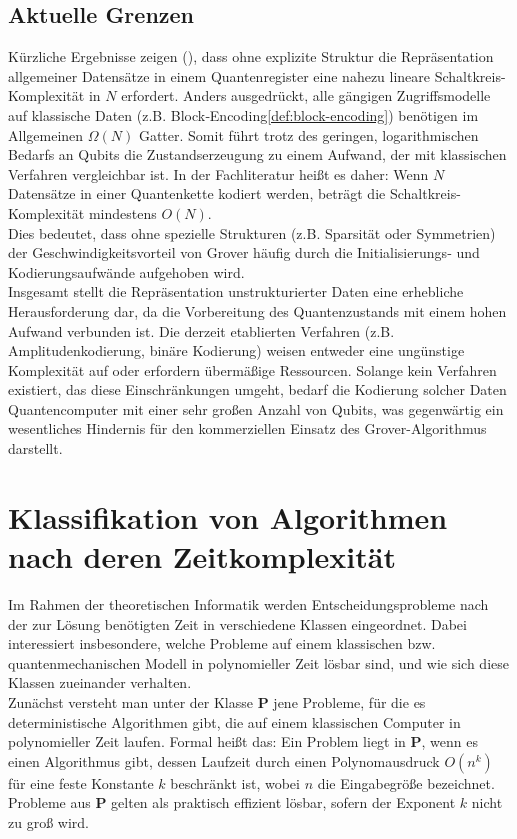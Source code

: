 {\subsection{Aktuelle Grenzen}
Kürzliche Ergebnisse zeigen (\cite{zhang_xiao-ming_circuit_2024}), dass ohne explizite Struktur die Repräsentation allgemeiner Datensätze in einem Quantenregister eine nahezu lineare Schaltkreis-Komplexität in \(N\) erfordert. Anders ausgedrückt, alle gängigen Zugriffsmodelle auf klassische Daten (z.B. Block‑Encoding\ref{def:block-encoding}) benötigen im Allgemeinen \(\Omega(N)\) Gatter. Somit führt trotz des geringen, logarithmischen Bedarfs an Qubits die Zustandserzeugung zu einem Aufwand, der mit klassischen Verfahren vergleichbar ist. In der Fachliteratur heißt es daher: 
Wenn \(N\) Datensätze in einer Quantenkette kodiert werden, beträgt die Schaltkreis-Komplexität mindestens \(O(N)\).\\

Dies bedeutet, dass ohne spezielle Strukturen (z.B. Sparsität oder Symmetrien) der Geschwindigkeitsvorteil von Grover häufig durch die Initialisierungs‑ und Kodierungsaufwände aufgehoben wird.\\

Insgesamt stellt die Repräsentation unstrukturierter Daten eine erhebliche Herausforderung dar, da die Vorbereitung des Quantenzustands mit einem hohen Aufwand verbunden ist. Die derzeit etablierten Verfahren (z.B. Amplitudenkodierung, binäre Kodierung) weisen entweder eine ungünstige Komplexität auf oder erfordern übermäßige Ressourcen. Solange kein Verfahren existiert, das diese Einschränkungen umgeht, bedarf die Kodierung solcher Daten Quantencomputer mit einer sehr großen Anzahl von Qubits, was gegenwärtig ein wesentliches Hindernis für den kommerziellen Einsatz des Grover-Algorithmus darstellt.

\section{Klassifikation von Algorithmen nach deren Zeitkomplexität}

Im Rahmen der theoretischen Informatik werden Entscheidungsprobleme nach der zur Lösung benötigten Zeit in verschiedene Klassen eingeordnet. Dabei interessiert insbesondere, welche Probleme auf einem klassischen bzw. quantenmechanischen Modell in polynomieller Zeit lösbar sind, und wie sich diese Klassen zueinander verhalten.\\

Zunächst versteht man unter der Klasse \(\mathbf{P}\) jene Probleme, für die es deterministische Algorithmen gibt, die auf einem klassischen Computer in polynomieller Zeit laufen. Formal heißt das: Ein Problem liegt in \(\mathbf{P}\), wenn es einen Algorithmus gibt, dessen Laufzeit durch einen Polynomausdruck \(O(n^k)\) für eine feste Konstante \(k\) beschränkt ist, wobei \(n\) die Eingabegröße bezeichnet. Probleme aus \(\mathbf{P}\) gelten als praktisch effizient lösbar, sofern der Exponent \(k\) nicht zu groß wird.\\

}
